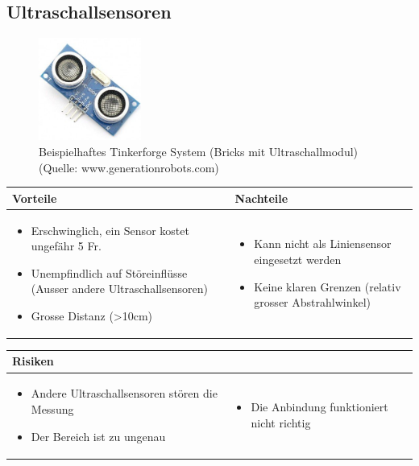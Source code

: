 \pagebreak


\subsection{Ultraschallsensoren}
\begin{figure}[h]
	\centering
	\includegraphics[width=0.3\textwidth]{fig/ultraschallsensor.png}
	\caption{Beispielhaftes Tinkerforge System (Bricks mit Ultraschallmodul) (Quelle: www.generationrobots.com)}
\end{figure}

\begin{table}[h]
\begin{tabular}{p{} | p{}}


\textbf{Vorteile} & \textbf{Nachteile} \\ \hline
	 
\begin{itemize}
\item Erschwinglich, ein Sensor kostet ungefähr 5 Fr.
\item Unempfindlich auf Störeinflüsse (Ausser andere Ultraschallsensoren)
\item Grosse Distanz (>10cm)
\end{itemize}
 &
\begin{itemize}
\item Kann nicht als Liniensensor eingesetzt werden
\item Keine klaren Grenzen (relativ grosser Abstrahlwinkel)
\end{itemize}
\end{tabular}
\end{table}


\begin{table}[h]
\begin{tabular}{p{}p{}}


 \textbf{Risiken} & \\ \hline
	 
\begin{itemize}
\item Andere Ultraschallsensoren stören die Messung
\item Der Bereich ist zu ungenau
\end{itemize}
&
\begin{itemize}
\item Die Anbindung funktioniert nicht richtig
\end{itemize}

 
\end{tabular}
\end{table}

